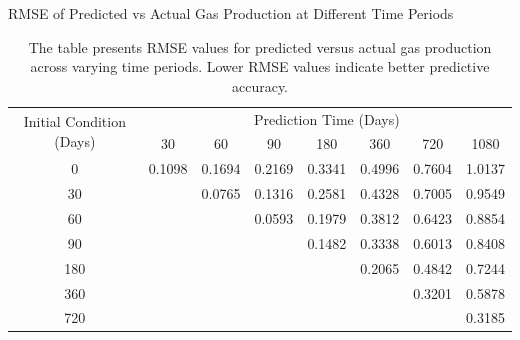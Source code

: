 \begin{table}
    \centering
    \caption{RMSE of Predicted vs Actual Gas Production at Different Time Periods}
    \label{tab:rmse_gas}
    \begin{tabular}{c|ccccccc}
        \toprule
        \multirow{2}{*}{Initial Condition (Days)} & \multicolumn{7}{c}{Prediction Time (Days)} \\
        \cmidrule{2-8}
        & 30 & 60 & 90 & 180 & 360 & 720 & 1080 \\
        \midrule
        0   & 0.1098 & 0.1694 & 0.2169 & 0.3341 & 0.4996 & 0.7604 & 1.0137 \\
        30   &  & 0.0765 & 0.1316 & 0.2581 & 0.4328 & 0.7005 & 0.9549 \\
        60   &  &  & 0.0593 & 0.1979 & 0.3812 & 0.6423 & 0.8854 \\
        90   &  &  &  & 0.1482 & 0.3338 & 0.6013 & 0.8408 \\
        180   &  &  &  &  & 0.2065 & 0.4842 & 0.7244 \\
        360   &  &  &  &  &  & 0.3201 & 0.5878 \\
        720   &  &  &  &  &  &  & 0.3185 \\
        \bottomrule
    \end{tabular}
    \vspace{0.2cm}
    \caption*{The table presents RMSE values for predicted versus actual gas production across varying time periods. Lower RMSE values indicate better predictive accuracy.}
\end{table}